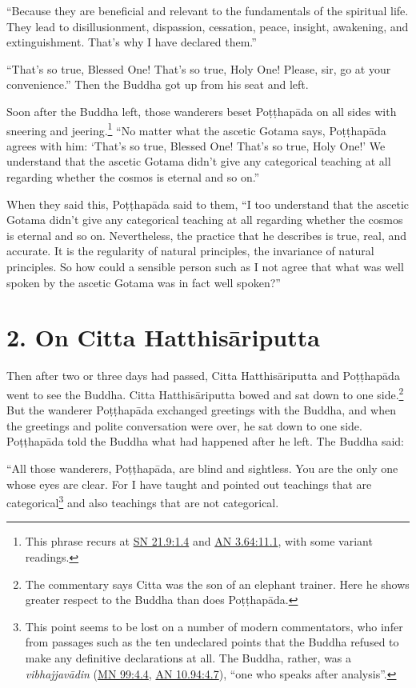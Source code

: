 \documentclass[12pt,openany]{book}%
\begin{document}
“Because they are beneficial and relevant to the fundamentals of the spiritual life. They lead to disillusionment, dispassion, cessation, peace, insight, awakening, and extinguishment. That’s why I have declared them.” 

“That’s so true, Blessed One! That’s so true, Holy One! Please, sir, go at your convenience.” Then the Buddha got up from his seat and left. 

Soon after the Buddha left, those wanderers beset \textsanskrit{Poṭṭhapāda} on all sides with sneering and jeering.\footnote{This phrase recurs at \href{https://suttacentral.net/sn21.9/en/sujato\#1.4}{SN 21.9:1.4} and \href{https://suttacentral.net/an3.64/en/sujato\#11.1}{AN 3.64:11.1}, with some variant readings. } “No matter what the ascetic Gotama says, \textsanskrit{Poṭṭhapāda} agrees with him: ‘That’s so true, Blessed One! That’s so true, Holy One!’ We understand that the ascetic Gotama didn’t give any categorical teaching at all regarding whether the cosmos is eternal and so on.” 

When they said this, \textsanskrit{Poṭṭhapāda} said to them, “I too understand that the ascetic Gotama didn’t give any categorical teaching at all regarding whether the cosmos is eternal and so on. Nevertheless, the practice that he describes is true, real, and accurate. It is the regularity of natural principles, the invariance of natural principles. So how could a sensible person such as I not agree that what was well spoken by the ascetic Gotama was in fact well spoken?” 

\section*{2. On Citta \textsanskrit{Hatthisāriputta} }

Then after two or three days had passed, Citta \textsanskrit{Hatthisāriputta} and \textsanskrit{Poṭṭhapāda} went to see the Buddha. Citta \textsanskrit{Hatthisāriputta} bowed and sat down to one side.\footnote{The commentary says Citta was the son of an elephant trainer. Here he shows greater respect to the Buddha than does \textsanskrit{Poṭṭhapāda}. } But the wanderer \textsanskrit{Poṭṭhapāda} exchanged greetings with the Buddha, and when the greetings and polite conversation were over, he sat down to one side. \textsanskrit{Poṭṭhapāda} told the Buddha what had happened after he left. The Buddha said: 

“All those wanderers, \textsanskrit{Poṭṭhapāda}, are blind and sightless. You are the only one whose eyes are clear. For I have taught and pointed out teachings that are categorical\footnote{This point seems to be lost on a number of modern commentators, who infer from passages such as the ten undeclared points that the Buddha refused to make any definitive declarations at all. The Buddha, rather, was a \textit{\textsanskrit{vibhajjavādin}} (\href{https://suttacentral.net/mn99/en/sujato\#4.4}{MN 99:4.4}, \href{https://suttacentral.net/an10.94/en/sujato\#4.7}{AN 10.94:4.7}), “one who speaks after analysis”. } and also teachings that are not categorical. 
\end{document}
